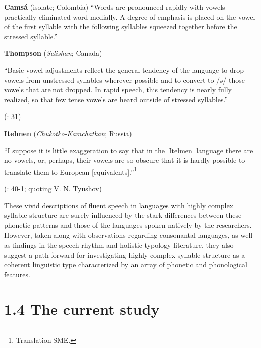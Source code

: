 \citep[43]{Kuipers1960}


\z

\ea\label{ex:(1.20)}
  \textbf{Camsá} (isolate; Colombia)
“Words are pronounced rapidly with vowels practically eliminated word medially. A degree of emphasis is placed on the vowel of the first syllable with the following syllables squeezed together before the stressed syllable.” 
\z






\citep[86-7]{Howard1967}



\ea\label{ex:(1.21)}
  \textbf{Thompson} (\textit{Salishan}; Canada)



“Basic vowel adjustments reflect the general tendency of the language to drop vowels from unstressed syllables wherever possible and to convert to /ə/ those vowels that are not dropped. In rapid speech, this tendency is nearly fully realized, so that few tense vowels are heard outside of stressed syllables.”



(\citealt{ThompsonThompson1992}: 31)
\z



\ea\label{ex:(1.22)}
  \textbf{Itelmen} (\textit{Chukotko-Kamchatkan}; Russia)



“I suppose it is little exaggeration to say that in the [Itelmen] language there are no vowels, or, perhaps, their vowels are so obscure that it is hardly possible to translate them to European [equivalents].”\footnote{ \textrm{Translation SME.}}


(\citealt{Volodin1976}: 40-1; quoting V. N. Tyushov)
\z




  These vivid descriptions of fluent speech in languages with highly complex syllable structure are surely influenced by the stark differences between these phonetic patterns and those of the languages spoken natively by the researchers. However, taken along with observations regarding consonantal languages, as well as findings in the speech rhythm and holistic typology literature, they also suggest a path forward for investigating highly complex syllable structure as a coherent linguistic type characterized by an array of phonetic and phonological features.


\section{1.4 The current study}

